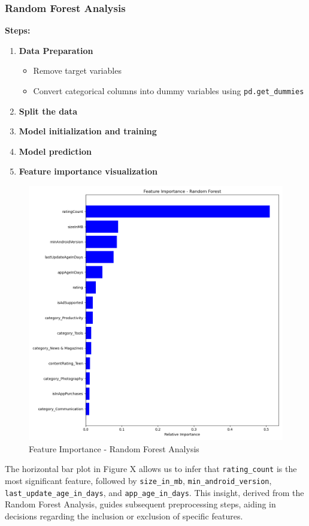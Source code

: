 \subsubsection{Random Forest Analysis}
\textbf{Steps:}
\begin{enumerate}
    \item \textbf{Data Preparation}
    \begin{itemize}
        \item Remove target variables
        \item Convert categorical columns into dummy variables using \texttt{pd.get\_dummies}
    \end{itemize}
    \item \textbf{Split the data}
    \item \textbf{Model initialization and training}
    \item \textbf{Model prediction}
    \item \textbf{Feature importance visualization}
\end{enumerate}
\begin{figure}[h]
\centering
\includegraphics[width=\textwidth]{docs//assets/rfa.png}
\caption{Feature Importance - Random Forest Analysis}
\end{figure}
The horizontal bar plot in Figure X allows us to infer that \texttt{rating\_count} is the most significant feature, followed by \texttt{size\_in\_mb}, \texttt{min\_android\_version}, \texttt{last\_update\_age\_in\_days}, and \texttt{app\_age\_in\_days}. This insight, derived from the Random Forest Analysis, guides subsequent preprocessing steps, aiding in decisions regarding the inclusion or exclusion of specific features.

